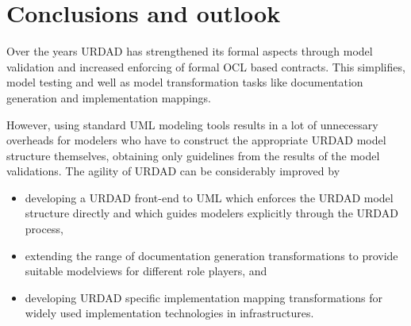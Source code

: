 \section{Conclusions and outlook}
\label{sec:conclusions}

Over the years URDAD has strengthened its formal aspects through model validation
and increased enforcing of formal OCL based contracts. This simplifies, model testing and well as model transformation tasks like documentation generation and implementation mappings.

However, using standard UML modeling tools results in a lot of unnecessary overheads for modelers who have to construct the appropriate URDAD model structure themselves, obtaining only guidelines from the results of the model validations. The agility of URDAD can be considerably improved by
\begin{itemize}
  \item developing a URDAD front-end to UML which enforces the URDAD model structure directly and which guides modelers explicitly through the URDAD process, 
  \item extending the range of documentation generation transformations to provide suitable modelviews for different role players, and
  \item developing URDAD specific implementation mapping transformations for widely used implementation technologies in infrastructures.
\end{itemize}

